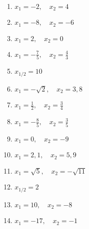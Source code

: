 \newpage
\begin{Answer}[ref=produktformNullstellenA1]\\
	\begin{minipage}{\textwidth}
		\begin{minipage}{0.49\textwidth}
			\begin{enumerate}[label=\alph*)]
				\item \(x_1=-2,\quad x_2=4\)
				\item \(x_1=-8,\quad x_2=-6\)
				\item \(x_1=2,\quad x_2=0\)
				\item \(x_1=-\frac{7}{5},\quad x_2=\frac{4}{3}\)
				\item \(x_{1/2}=10\)
				\item \(x_1=-\sqrt{2},\quad x_2=3,8\)
				\item \(x_1=\frac{1}{2},\quad x_2=\frac{3}{4}\)
			\end{enumerate}
		\end{minipage}
		\begin{minipage}{0.49\textwidth}
			\begin{enumerate}[label=\alph*)]
				\setcounter{enumi}{7}
				\item \(x_1=-\frac{8}{5},\quad x_2=\frac{3}{5}\)
				\item \(x_1=0,\quad x_2=-9\)
				\item \(x_1=2,1,\quad x_2=5,9\)
				\item \(x_1=\sqrt{5},\quad x_2=-\sqrt{11}\)
				\item \(x_{1/2}=2\)
				\item \(x_1=10,\quad x_2=-8\)
				\item \(x_1=-17,\quad x_2=-1\)
			\end{enumerate}
		\end{minipage}
	\end{minipage}
\end{Answer}
